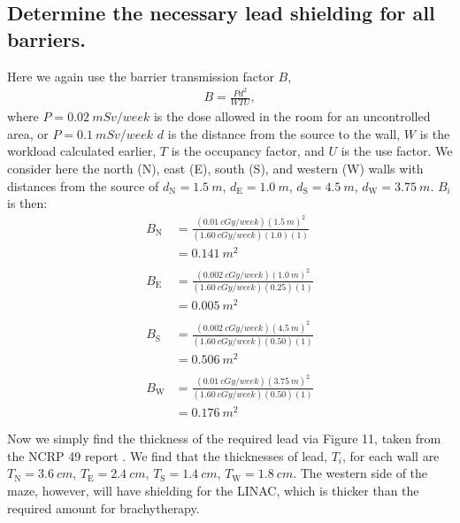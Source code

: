 \documentclass[%
aps,
mph,%
amsmath,amssymb,
preprint,%
tightenlines,
longbibliography,
superscriptaddress,
floatfix,
nofootinbib,
]{revtex4-2}
\begin{document}
    \subsection{Determine the necessary lead shielding for all barriers.}
    Here we again use the barrier transmission factor $B$,
    \begin{align}
        B = \frac{Pd^2}{WTU},
    \end{align}
    where $P = \qty{0.02}{mSv/week}$ is the dose allowed in the room for an uncontrolled area, or $P = \qty{0.1}{mSv/week}$ $d$ is the distance from the source to the wall, $W$ is the workload calculated earlier, $T$ is the occupancy factor, and $U$ is the use factor. We consider here the north (N), east (E), south (S), and western (W) walls with distances from the source of $d_\mathrm{N} = \qty{1.5}{m}$, $d_\mathrm{E} = \qty{1.0}{m}$, $d_\mathrm{S} = \qty{4.5}{m}$, $d_\mathrm{W} = \qty{3.75}{m}$. $B_i$ is then:
    \begin{align*}
        B_{\mathrm{N}} &= \frac{\left(\qty{0.01}{cGy/week}\right)\left(\qty{1.5}{m}\right)^2}{\left(\qty{1.60}{cGy/week}\right)\left(1.0\right)\left( 1 \right)}\\
        &= \qty{0.141}{m^2} \\ \\
        B_{\mathrm{E}} &= \frac{\left(\qty{0.002}{cGy/week}\right)\left(\qty{1.0}{m}\right)^2}{\left(\qty{1.60}{cGy/week}\right)\left(0.25\right)\left( 1 \right)}\\
        &= \qty{0.005}{m^2} \\ \\ 
        B_{\mathrm{S}} &= \frac{\left(\qty{0.002}{cGy/week}\right)\left(\qty{4.5}{m}\right)^2}{\left(\qty{1.60}{cGy/week}\right)\left(0.50\right)\left( 1 \right)}\\
        &= \qty{0.506}{m^2} \\ \\ 
        B_{\mathrm{W}} &= \frac{\left(\qty{0.01}{cGy/week}\right)\left(\qty{3.75}{m}\right)^2}{\left(\qty{1.60}{cGy/week}\right)\left(0.50\right)\left( 1 \right)}\\
        &= \qty{0.176}{m^2} \\ \\ 
    \end{align*}
    Now we simply find the thickness of the required lead via Figure 11, taken from the NCRP 49 report \cite{simmons1978structural}. We find that the thicknesses of lead, $T_{i}$, for each wall are $T_\mathrm{N} = \qty{3.6}{cm}$, $T_\mathrm{E} = \qty{2.4}{cm}$, $T_\mathrm{S} = \qty{1.4}{cm}$, $T_\mathrm{W} = \qty{1.8}{cm}$. The western side of the maze, however, will have shielding for the LINAC, which is thicker than the required amount for brachytherapy. 
\end{document}
